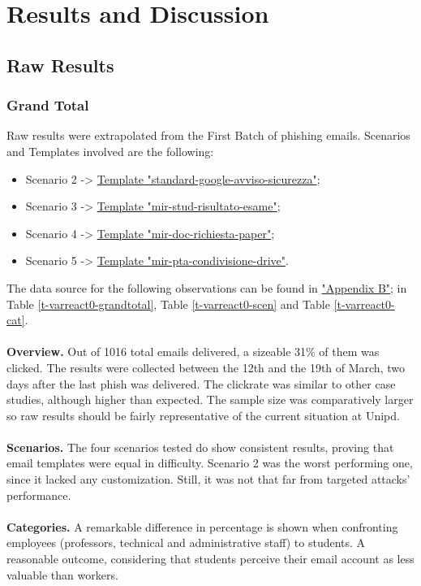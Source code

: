 \documentclass[a4paper]{article}
\begin{document}
\newpage

\section{Results and Discussion}

\subsection{Raw Results}

\subsubsection{Grand Total}

Raw results were extrapolated from the First Batch of phishing emails. Scenarios and Templates involved are the following:

\begin{itemize}
    \item Scenario 2 -> \hyperlink{template-s2b1}{Template "standard-google-avviso-sicurezza"};
    \item Scenario 3 -> \hyperlink{template-s3b1}{Template "mir-stud-risultato-esame"};
    \item Scenario 4 -> \hyperlink{template-s4b1}{Template "mir-doc-richiesta-paper"};
    \item Scenario 5 -> \hyperlink{template-s5b1}{Template "mir-pta-condivisione-drive"}.
\end{itemize}

\noindent
The data source for the following observations can be found in \hyperlink{appendix-results}{"Appendix B"}; in Table \ref{t-varreact0-grandtotal}, Table \ref{t-varreact0-scen} and Table \ref{t-varreact0-cat}.
\\ \\
\textbf{Overview.} Out of 1016 total emails delivered, a sizeable 31\% of them was clicked. The results were collected between the 12th and the 19th of March, two days after the last phish was delivered. The clickrate was similar to other case studies, although higher than expected. The sample size was comparatively larger so raw results should be fairly representative of the current situation at Unipd.
\\ \\
\textbf{Scenarios.} The four scenarios tested do show consistent results, proving that email templates were equal in difficulty. Scenario 2 was the worst performing one, since it lacked any customization. Still, it was not that far from targeted attacks' performance. 
\\ \\
\textbf{Categories.} A remarkable difference in percentage is shown when confronting employees (professors, technical and administrative staff) to students. A reasonable outcome, considering that students perceive their email account as less valuable than workers.
\end{document}
